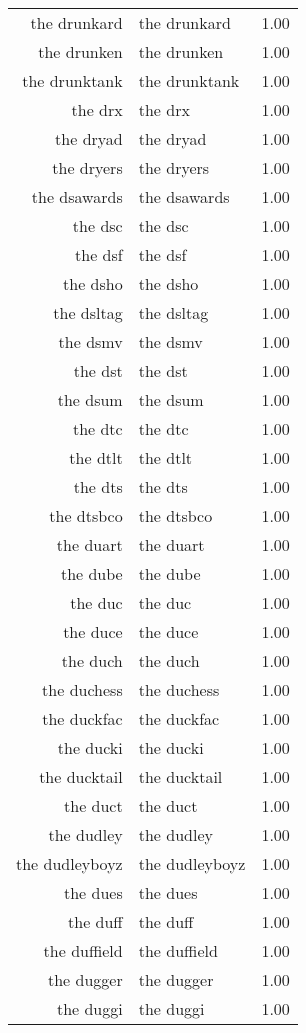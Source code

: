 \begin{table}[ht]
\begin{tabular}{rlr}
  the drunkard & the drunkard & 1.00 \\ 
  the drunken & the drunken & 1.00 \\ 
  the drunktank & the drunktank & 1.00 \\ 
  the drx & the drx & 1.00 \\ 
  the dryad & the dryad & 1.00 \\ 
  the dryers & the dryers & 1.00 \\ 
  the dsawards & the dsawards & 1.00 \\ 
  the dsc & the dsc & 1.00 \\ 
  the dsf & the dsf & 1.00 \\ 
  the dsho & the dsho & 1.00 \\ 
  the dsltag & the dsltag & 1.00 \\ 
  the dsmv & the dsmv & 1.00 \\ 
  the dst & the dst & 1.00 \\ 
  the dsum & the dsum & 1.00 \\ 
  the dtc & the dtc & 1.00 \\ 
  the dtlt & the dtlt & 1.00 \\ 
  the dts & the dts & 1.00 \\ 
  the dtsbco & the dtsbco & 1.00 \\ 
  the duart & the duart & 1.00 \\ 
  the dube & the dube & 1.00 \\ 
  the duc & the duc & 1.00 \\ 
  the duce & the duce & 1.00 \\ 
  the duch & the duch & 1.00 \\ 
  the duchess & the duchess & 1.00 \\ 
  the duckfac & the duckfac & 1.00 \\ 
  the ducki & the ducki & 1.00 \\ 
  the ducktail & the ducktail & 1.00 \\ 
  the duct & the duct & 1.00 \\ 
  the dudley & the dudley & 1.00 \\ 
  the dudleyboyz & the dudleyboyz & 1.00 \\ 
  the dues & the dues & 1.00 \\ 
  the duff & the duff & 1.00 \\ 
  the duffield & the duffield & 1.00 \\ 
  the dugger & the dugger & 1.00 \\ 
  the duggi & the duggi & 1.00 \\ 

\end{tabular}
\end{table}
